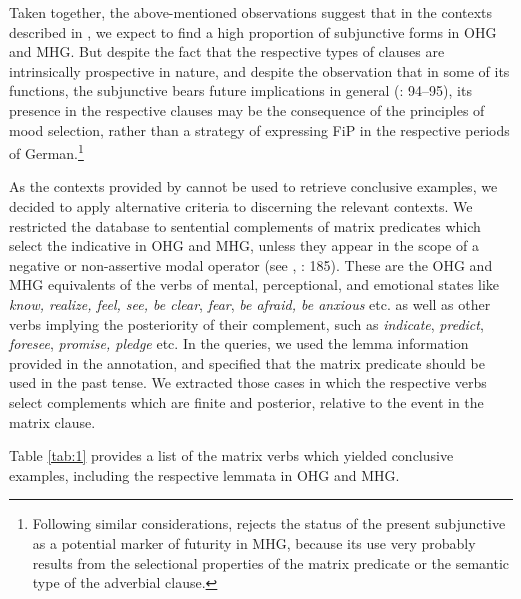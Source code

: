 \documentclass[output=paper,colorlinks,citecolor=brown]{langscibook}
\begin{document}
Taken together, the above-mentioned observations suggest that in the contexts described in \citet{Dahl2000}, we expect to find a high proportion of subjunctive forms in OHG and MHG. But despite the fact that the respective types of clauses are intrinsically prospective in nature, and despite the observation that in some of its functions, the subjunctive bears future implications in general (\cite{Ultan1978}: 94–95), its presence in the respective clauses may be the consequence of the principles of mood selection, rather than a strategy of expressing FiP in the respective periods of German.\footnote{Following similar considerations, \citet[63]{Luther2013} rejects the status of the present subjunctive as a potential marker of futurity in MHG, because its use very probably results from the selectional properties of the matrix predicate or the semantic type of the adverbial clause.}

As the contexts provided by \citet[797]{Dahl2000} cannot be used to retrieve conclusive examples, we decided to apply alternative criteria to discerning the relevant contexts. We restricted the database to sentential complements of matrix predicates which select the indicative in OHG and MHG, unless they appear in the scope of a negative or non-assertive modal operator (see \cite{Schrodt1983}, \citeyear{Schrodt2004}: 185). These are the OHG and MHG equivalents of the verbs of mental, perceptional, and emotional states like \textit{know, realize, feel, see, be clear}, \textit{fear}, \textit{be afraid, be anxious} etc. as well as other verbs implying the posteriority of their complement, such as \textit{indicate}, \textit{predict}, \textit{foresee}, \textit{promise, pledge} etc. In the queries, we used the lemma information provided in the annotation, and specified that the matrix predicate should be used in the past tense. We extracted those cases in which the respective verbs select complements which are finite and posterior, relative to the event in the matrix clause.

Table \ref{tab:1} provides a list of the matrix verbs which yielded conclusive examples, including the respective lemmata in OHG and MHG.

\end{document}
